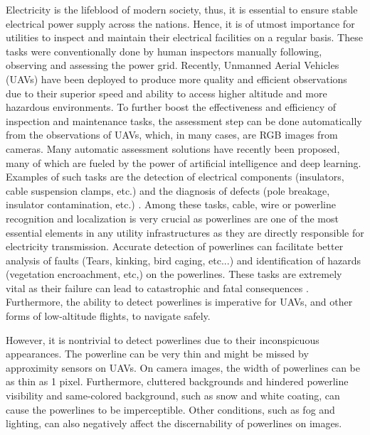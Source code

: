 \documentclass[journal]{IEEEtran}
\begin{document}
Electricity is the lifeblood of modern society, thus, it is essential to ensure stable electrical power supply across the nations. Hence, it is of utmost importance for utilities to inspect and maintain their electrical facilities on a regular basis. These tasks were conventionally done by human inspectors manually following, observing and assessing the power grid. Recently, Unmanned Aerial
Vehicles (UAVs) have been deployed to produce more quality and efficient observations due to their superior speed and ability to access higher altitude and more hazardous environments. To further boost the effectiveness and efficiency of inspection and maintenance tasks, the assessment step can be done automatically from the observations of UAVs, which, in many cases, are RGB images from cameras. Many automatic assessment solutions have recently been proposed, many of which are fueled by the power of artificial intelligence and deep learning. Examples of such tasks are the detection of electrical components (insulators, cable suspension clamps, etc.) and the diagnosis of defects (pole breakage, insulator contamination, etc.) \cite{nhan_examples, insulator_examples,detect_component_examples}. Among these tasks, cable, wire or powerline recognition and localization is very crucial as powerlines are one of the most essential elements in any utility infrastructures as they are directly responsible for electricity transmission. Accurate detection of powerlines can facilitate better analysis of faults (Tears, kinking, bird caging, etc...) and identification of hazards (vegetation encroachment, etc,) on the powerlines. These tasks are extremely vital as their failure can lead to catastrophic and fatal consequences \cite{pge_bankruptcy}. Furthermore, the ability to detect powerlines is imperative for UAVs, and other forms of low-altitude flights, to navigate safely.

However, it is nontrivial to detect powerlines due to their inconspicuous appearances. The powerline can be very thin and might be missed by approximity sensors on UAVs. On camera images, the width of powerlines can be as thin as 1 pixel. Furthermore, cluttered backgrounds and hindered powerline visibility and same-colored background, such as snow and white coating, can cause the powerlines to be imperceptible. Other conditions, such as fog and lighting, can also negatively affect the discernability of powerlines on images. 
\end{document}
